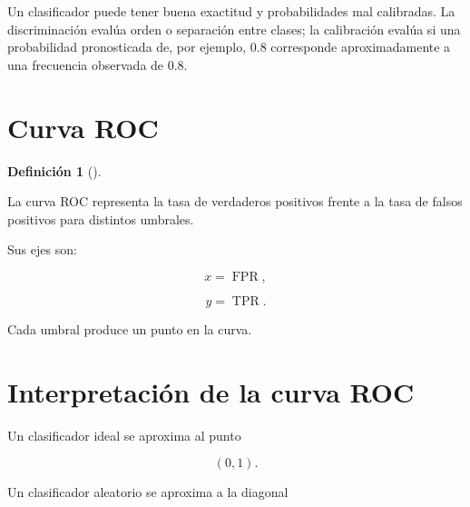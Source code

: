 \documentclass[
  spanish,
  10.5pt,
  letterpaper,
  DIV=11,
  numbers=noendperiod,
  oneside,
  open=any]{scrreprt}
\theoremstyle{definition}
\newtheorem{definition}{Definición}[chapter]
\theoremstyle{definition}
\theoremstyle{plain}
\theoremstyle{remark}
\begin{document}
\begin{tcolorbox}[enhanced jigsaw, arc=.35mm, bottomrule=.15mm, bottomtitle=1mm, breakable, colback=white, colbacktitle=quarto-callout-note-color!10!white, colframe=quarto-callout-note-color-frame, coltitle=black, left=2mm, leftrule=.75mm, opacityback=0, opacitybacktitle=0.6, rightrule=.15mm, title=\textcolor{quarto-callout-note-color}{\faInfo}\hspace{0.5em}{Clasificación y calibración}, titlerule=0mm, toprule=.15mm, toptitle=1mm]

Un clasificador puede tener buena exactitud y probabilidades mal
calibradas. La discriminación evalúa orden o separación entre clases; la
calibración evalúa si una probabilidad pronosticada de, por ejemplo, 0.8
corresponde aproximadamente a una frecuencia observada de 0.8.

\end{tcolorbox}

\section*{Curva ROC}\label{curva-roc}


\begin{definition}[]\protect\hypertarget{def-curva-roc}{}\label{def-curva-roc}

La curva ROC representa la tasa de verdaderos positivos frente a la tasa
de falsos positivos para distintos umbrales.

\end{definition}

Sus ejes son:

\[
x=\operatorname{FPR},
\]

\[
y=\operatorname{TPR}.
\]

Cada umbral produce un punto en la curva.

\section*{Interpretación de la curva
ROC}\label{interpretaciuxf3n-de-la-curva-roc}


Un clasificador ideal se aproxima al punto

\[
(0,1).
\]

Un clasificador aleatorio se aproxima a la diagonal
\end{document}
